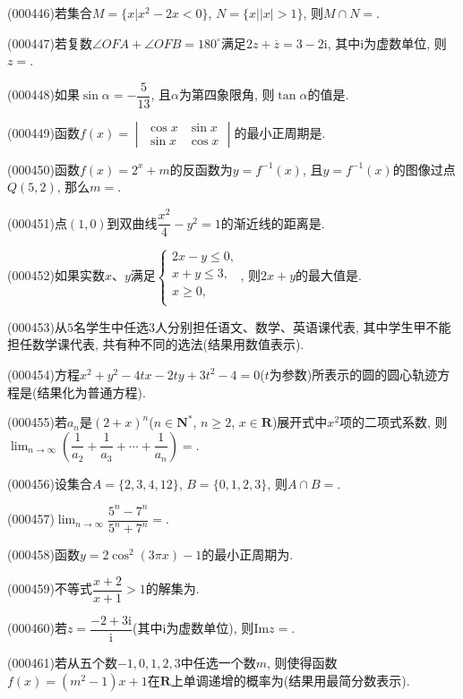 \item (000446)若集合$M=\{x|{x^2}-2x<0\}$, $N=\{x||x|>1\}$, 则$M\cap N=$.
\item (000447)若复数$\angle OFA+\angle OFB={180^\circ}$满足$2z+\overline z=3-2\mathrm{i}$, 其中$\mathrm{i}$为虚数单位, 则$z=$.
\item (000448)如果$\sin \alpha =-\dfrac5{13}$, 且$\alpha$为第四象限角, 则$\tan \alpha$的值是.
\item (000449)函数$f(x)=\begin{vmatrix}   \cos x & \sin x  \\    \sin x & \cos x \end{vmatrix}$的最小正周期是.
\item (000450)函数$f(x)=2^x+m$的反函数为$y=f^{-1}(x)$, 且$y=f^{-1}(x)$的图像过点$Q(5,2)$, 那么$m=$.
\item (000451)点$(1,0)$到双曲线$\dfrac{x^2}4-y^2=1$的渐近线的距离是.
\item (000452)如果实数$x$、$y$满足$\begin{cases} 2x-y\le 0, \\ x+y\le 3, \\  x\ge 0, \\ \end{cases}$, 则$2x+y$的最大值是.
\item (000453)从$5$名学生中任选$3$人分别担任语文、数学、英语课代表, 其中学生甲不能担任数学课代表, 共有种不同的选法(结果用数值表示).
\item (000454)方程$x^2+y^2-4tx-2ty+3t^2-4=0$($t$为参数)所表示的圆的圆心轨迹方程是(结果化为普通方程).
\item (000455)若$a_n$是$(2+x)^n$($n\in \mathbf{N}^*$, $n\ge 2$, $x\in \mathbf{R}$)展开式中$x^2$项的二项式系数, 则$\displaystyle\lim_{n\to\infty}(\dfrac 1{a_2}+\dfrac 1{a_3}+\cdots+\dfrac1{a_n})=$.
\item (000456)设集合$A=\{2,3,4,12\}$, $B=\{0,1,2,3\}$, 则$A\cap B=$.
\item (000457)$\displaystyle\lim_{n\to\infty}\dfrac{5^n-7^n}{5^n+7^n}=$.
\item (000458)函数$y=2\cos^2(3\pi x)-1$的最小正周期为.
\item (000459)不等式$\dfrac{x+2}{x+1}>1$的解集为.
\item (000460)若$z=\dfrac{-2+3\mathrm{i}}{\mathrm{i}}$(其中$\mathrm{i}$为虚数单位), 则$\mathrm{Im} z=$.
\item (000461)若从五个数$-1,0,1,2,3$中任选一个数$m$, 则使得函数$f(x)=(m^2-1)x+1$在$\mathbf{R}$上单调递增的概率为(结果用最简分数表示).
